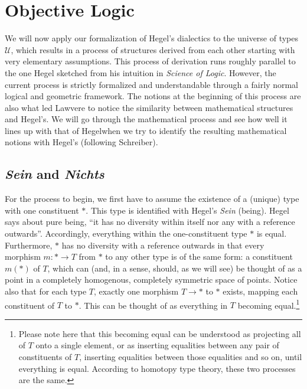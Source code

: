 \documentclass{article}
\begin{document}
\section{Objective Logic}
We will now apply our formalization of Hegel's dialectics to the universe of types $\mathcal{U}$, which
results in a process of structures derived from each other starting with very elementary assumptions. This
process of derivation runs roughly parallel to the one Hegel sketched from his intuition in \emph{Science of
Logic}. However, the current process is strictly formalized and understandable through a fairly normal
logical and geometric framework. The notions at the beginning of this process are also what led Lawvere to
notice the similarity between mathematical structures and Hegel's. We will go through the mathematical
process and see how well it lines up with that of Hegelwhen we try to identify the resulting mathematical notions with Hegel's (following Schreiber).


\subsection{\emph{Sein} and \emph{Nichts}}
For the process to begin, we first have to assume the existence of a (unique) type with one constituent $*$.
This type is identified with Hegel's \emph{Sein} (being). Hegel says about pure being, ``it has no diversity
within itself nor any with a reference outwards''. Accordingly, everything within the one-constituent type
$*$ is equal. Furthermore, $*$ has no diversity with a reference outwards in that every morphism
$m:*\rightarrow T$ from $*$ to any other type is of the same form: a constituent $m(*)$ of $T$, which can
(and, in a sense, should, as we will see) be thought of as a point in a completely homogenous, completely
symmetric space of points. Notice also that for each type $T$, exactly one morphism $T\rightarrow *$ to $*$
exists, mapping each constituent of $T$ to $*$. This can be thought of as everything in $T$ becoming
equal.\footnote{Please note here that this becoming equal can be understood as projecting all of $T$ onto a 
single element, or as inserting equalities between any pair of constituents of $T$, inserting equalities 
between those equalities and so on, until everything is equal. According to homotopy type theory, these two 
processes are the same.} \\ 
\end{document}
